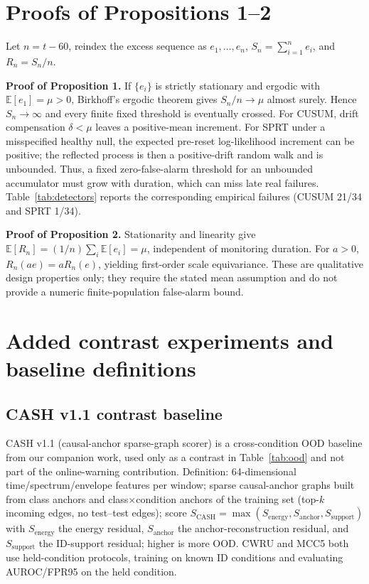 \documentclass[journal]{IEEEtran}
\begin{document}
\appendix
\section{Proofs of Propositions 1--2}\label{app:proof}
Let $n=t-60$, reindex the excess sequence as $e_1,\dots,e_n$, $S_n=\sum_{i=1}^{n}e_i$, and $R_n=S_n/n$.

\textbf{Proof of Proposition 1.} If $\{e_i\}$ is strictly stationary and ergodic with $\mathbb{E}[e_1]=\mu>0$, Birkhoff's ergodic theorem gives $S_n/n\to\mu$ almost surely. Hence $S_n\to\infty$ and every finite fixed threshold is eventually crossed. For CUSUM, drift compensation $\delta<\mu$ leaves a positive-mean increment. For SPRT under a misspecified healthy null, the expected pre-reset log-likelihood increment can be positive; the reflected process is then a positive-drift random walk and is unbounded. Thus, a fixed zero-false-alarm threshold for an unbounded accumulator must grow with duration, which can miss late real failures. Table~\ref{tab:detectors} reports the corresponding empirical failures (CUSUM 21/34 and SPRT 1/34).

\textbf{Proof of Proposition 2.} Stationarity and linearity give $\mathbb{E}[R_n]=(1/n)\sum_i\mathbb{E}[e_i]=\mu$, independent of monitoring duration. For $a>0$, $R_n(ae)=aR_n(e)$, yielding first-order scale equivariance. These are qualitative design properties only; they require the stated mean assumption and do not provide a numeric finite-population false-alarm bound.

\section{Added contrast experiments and baseline definitions}\label{app:baselines}
\subsection*{CASH v1.1 contrast baseline}
CASH v1.1 (causal-anchor sparse-graph scorer) is a cross-condition OOD baseline from our companion work, used only as a contrast in Table~\ref{tab:ood} and not part of the online-warning contribution. Definition: 64-dimensional time/spectrum/envelope features per window; sparse causal-anchor graphs built from class anchors and class$\times$condition anchors of the training set (top-$k$ incoming edges, no test--test edges); score $S_{\mathrm{CASH}}=\max(S_{\mathrm{energy}},S_{\mathrm{anchor}},S_{\mathrm{support}})$ with $S_{\mathrm{energy}}$ the energy residual, $S_{\mathrm{anchor}}$ the anchor-reconstruction residual, and $S_{\mathrm{support}}$ the ID-support residual; higher is more OOD. CWRU and MCC5 both use held-condition protocols, training on known ID conditions and evaluating AUROC/FPR95 on the held condition.
\end{document}
